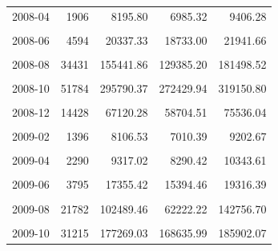 \begin{longtable}[t]{crrrr}
2008-04 & 1906 & 8195.80 & 6985.32 & 9406.28\\
\cellcolor{gray!10}{2008-05} & \cellcolor{gray!10}{2951} & \cellcolor{gray!10}{12634.53} & \cellcolor{gray!10}{11321.49} & \cellcolor{gray!10}{13947.57}\\
2008-06 & 4594 & 20337.33 & 18733.00 & 21941.66\\
\cellcolor{gray!10}{2008-07} & \cellcolor{gray!10}{14029} & \cellcolor{gray!10}{56639.62} & \cellcolor{gray!10}{47823.85} & \cellcolor{gray!10}{65455.38}\\
2008-08 & 34431 & 155441.86 & 129385.20 & 181498.52\\
\cellcolor{gray!10}{2008-09} & \cellcolor{gray!10}{50671} & \cellcolor{gray!10}{257996.90} & \cellcolor{gray!10}{244678.19} & \cellcolor{gray!10}{271315.61}\\
2008-10 & 51784 & 295790.37 & 272429.94 & 319150.80\\
\cellcolor{gray!10}{2008-11} & \cellcolor{gray!10}{30724} & \cellcolor{gray!10}{143826.98} & \cellcolor{gray!10}{117366.16} & \cellcolor{gray!10}{170287.80}\\
2008-12 & 14428 & 67120.28 & 58704.51 & 75536.04\\
\cellcolor{gray!10}{2009-01} & \cellcolor{gray!10}{3874} & \cellcolor{gray!10}{20214.43} & \cellcolor{gray!10}{17574.35} & \cellcolor{gray!10}{22854.51}\\
2009-02 & 1396 & 8106.53 & 7010.39 & 9202.67\\
\cellcolor{gray!10}{2009-03} & \cellcolor{gray!10}{2002} & \cellcolor{gray!10}{8794.91} & \cellcolor{gray!10}{7399.45} & \cellcolor{gray!10}{10190.37}\\
2009-04 & 2290 & 9317.02 & 8290.42 & 10343.61\\
\cellcolor{gray!10}{2009-05} & \cellcolor{gray!10}{3138} & \cellcolor{gray!10}{13265.47} & \cellcolor{gray!10}{12034.43} & \cellcolor{gray!10}{14496.51}\\
2009-06 & 3795 & 17355.42 & 15394.46 & 19316.39\\
\cellcolor{gray!10}{2009-07} & \cellcolor{gray!10}{7824} & \cellcolor{gray!10}{45388.48} & \cellcolor{gray!10}{28503.30} & \cellcolor{gray!10}{62273.67}\\
2009-08 & 21782 & 102489.46 & 62222.22 & 142756.70\\
\cellcolor{gray!10}{2009-09} & \cellcolor{gray!10}{36116} & \cellcolor{gray!10}{194349.19} & \cellcolor{gray!10}{174184.84} & \cellcolor{gray!10}{214513.54}\\
2009-10 & 31215 & 177269.03 & 168635.99 & 185902.07\\

\end{longtable}
